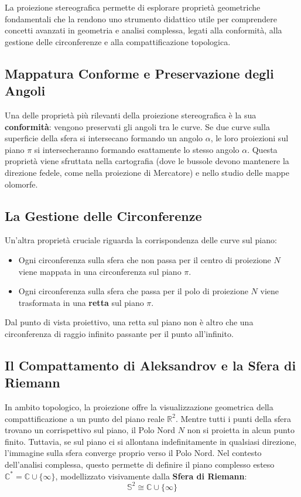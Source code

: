 \documentclass[11pt]{article}
\begin{document}
La proiezione stereografica permette di esplorare proprietà geometriche fondamentali che la rendono uno strumento didattico utile per comprendere concetti avanzati in geometria e analisi complessa, legati alla conformità, alla gestione delle circonferenze e alla compattificazione topologica.

\subsection{Mappatura Conforme e Preservazione degli Angoli}
Una delle proprietà più rilevanti della proiezione stereografica è la sua \textbf{conformità}: vengono preservati gli angoli tra le curve. Se due curve sulla superficie della sfera si intersecano formando un angolo $\alpha$, le loro proiezioni sul piano $\pi$ si intersecheranno formando esattamente lo stesso angolo $\alpha$. Questa proprietà viene sfruttata nella cartografia (dove le bussole devono mantenere la direzione fedele, come nella proiezione di Mercatore) e nello studio delle mappe olomorfe.

\subsection{La Gestione delle Circonferenze}
Un'altra proprietà cruciale riguarda la corrispondenza delle curve sul piano:
\begin{itemize}
    \item Ogni circonferenza sulla sfera che non passa per il centro di proiezione $N$ viene mappata in una circonferenza sul piano $\pi$.
    \item Ogni circonferenza sulla sfera che passa per il polo di proiezione $N$ viene trasformata in una \textbf{retta} sul piano $\pi$.
\end{itemize}
Dal punto di vista proiettivo, una retta sul piano non è altro che una circonferenza di raggio infinito passante per il punto all'infinito.

\subsection{Il Compattamento di Aleksandrov e la Sfera di Riemann}
In ambito topologico, la proiezione offre la visualizzazione geometrica della compattificazione a un punto del piano reale $\mathbb{R}^2$. Mentre tutti i punti della sfera trovano un corrispettivo sul piano, il Polo Nord $N$ non si proietta in alcun punto finito. Tuttavia, se sul piano ci si allontana indefinitamente in qualsiasi direzione, l'immagine sulla sfera converge proprio verso il Polo Nord. Nel contesto dell'analisi complessa, questo permette di definire il piano complesso esteso $\mathbb{C}^* = \mathbb{C} \cup \{\infty\}$, modellizzato visivamente dalla \textbf{Sfera di Riemann}:
$$\mathbb{S}^2 \cong \mathbb{C} \cup \{\infty\}$$
\end{document}
